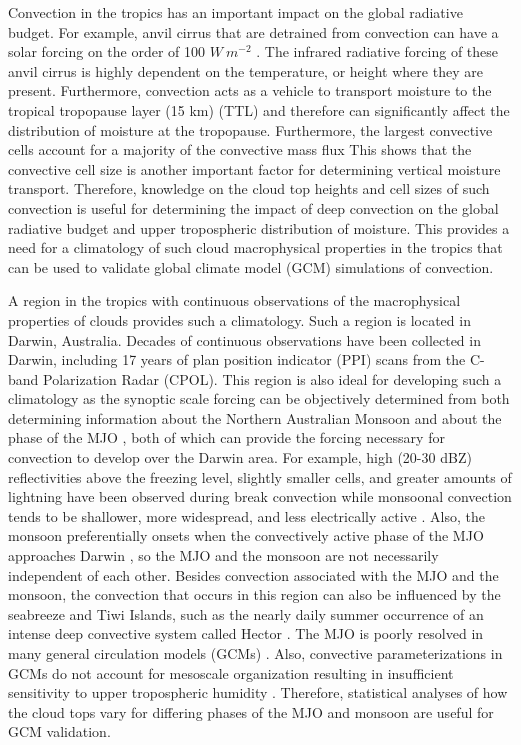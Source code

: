 \documentclass[journal abbreviation, manuscript]{copernicus}
\begin{document}
	Convection in the tropics has an important impact on the global radiative budget. For example, anvil cirrus that are detrained from convection can have a solar forcing on the order of 100 $W \ m^{-2}$ \citep{Jensenetal1994}. The infrared radiative forcing of these anvil cirrus is highly dependent on the temperature, or height where they are present. Furthermore, convection acts as a vehicle to transport moisture to the tropical tropopause layer (15 km) (TTL) \citep{Dessleretal2002} and therefore can significantly affect the distribution of moisture at the tropopause. Furthermore, the largest convective cells account for a majority of the convective mass flux \citep{Kumaretal2015, MasunagaandLuo2016, Hagosetal2018} This shows that the convective cell size is another important factor for determining vertical moisture transport. Therefore, knowledge on the cloud top heights and cell sizes of such convection is useful for determining the impact of deep convection on the global radiative budget and upper tropospheric distribution of moisture. This provides a need for a climatology of such cloud macrophysical properties in the tropics that can be used to validate global climate model (GCM) simulations of convection.
    
    A region in the tropics with continuous observations of the macrophysical properties of clouds provides such a climatology. Such a region is located in Darwin, Australia. Decades of continuous observations have been collected in Darwin, including 17 years of plan position indicator (PPI) scans from the C-band Polarization Radar (CPOL). This region is also ideal for developing such a climatology as the synoptic scale forcing can be objectively determined from both determining information about the Northern Australian Monsoon \citep{Dros1996,Popeetal2008} and about the phase of the MJO \citep{MaddenJulian1971,WheelerHendon2004}, both of which can provide the forcing necessary for convection to develop over the Darwin area. For example, high (20-30 dBZ) reflectivities above the freezing level, slightly smaller cells, and greater amounts of lightning have been observed during break convection while monsoonal convection tends to be shallower, more widespread, and less electrically active \citep{Rutledgeetal1992, Williamsetal1992, MayandBallinger2006, Kumaretal2013, Kumaretal2013b}. Also, the monsoon preferentially onsets when the convectively active phase of the MJO approaches Darwin \citep{Evansetal2014}, so the MJO and the monsoon are not necessarily independent of each other. Besides convection associated with the MJO and the monsoon, the convection that occurs in this region can also be influenced by the seabreeze and Tiwi Islands, such as the nearly daily summer occurrence of an intense deep convective system called Hector \citep{Keenanetal1989, Crook2001}. The MJO is poorly resolved in many general circulation models (GCMs) \citep{Guetal2016}. Also, convective parameterizations in GCMs do not account for mesoscale organization resulting in insufficient sensitivity to upper tropospheric humidity \citep{DelGenio2012}. Therefore, statistical analyses of how the cloud tops vary for differing phases of the MJO and monsoon are useful for GCM validation.  
    
\end{document}
